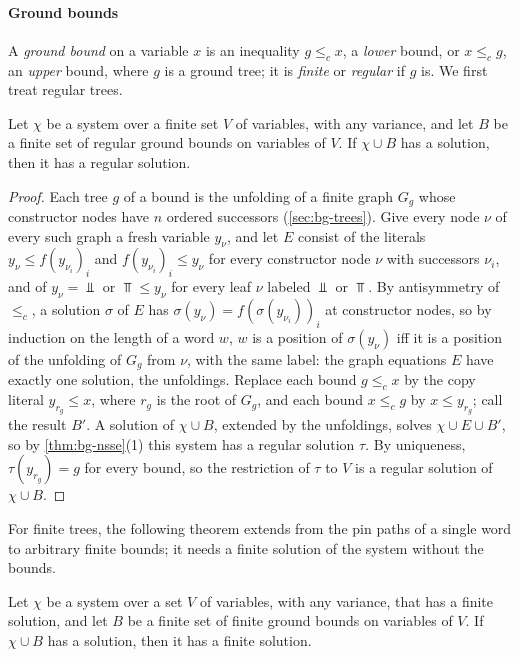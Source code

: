 \paragraph{Ground bounds}
A \emph{ground bound} on a variable $x$ is an inequality $g\le_cx$, a
\emph{lower} bound, or $x\le_cg$, an \emph{upper} bound, where $g$ is a ground
tree; it is \emph{finite} or \emph{regular} if $g$ is. We first treat regular
trees.

\begin{lemma}\label{lem:tc-pinning-regular}
Let $\chi$ be a system over a finite set $V$ of variables, with any variance, and let
$B$ be a finite set of regular ground bounds on variables of $V$. If
$\chi\cup B$ has a solution, then it has a regular solution.
\end{lemma}

\begin{proof}
Each tree $g$ of a bound is the unfolding of a finite graph $G_g$ whose
constructor nodes have $n$ ordered successors (\cref{sec:bg-trees}). Give every
node $\nu$ of every such graph a fresh variable $y_\nu$, and let $E$ consist of
the literals $y_\nu\le f(y_{\nu_i})_i$ and $f(y_{\nu_i})_i\le y_\nu$ for every
constructor node $\nu$ with successors $\nu_i$, and of $y_\nu=\Bot$ or
$\Top\le y_\nu$ for every leaf $\nu$ labeled $\Bot$ or $\Top$. By antisymmetry of
$\le_c$, a solution $\sigma$ of $E$ has $\sigma(y_\nu)=f(\sigma(y_{\nu_i}))_i$
at constructor nodes, so by induction on the length of a word $w$, $w$ is a
position of $\sigma(y_\nu)$ iff it is a position of the unfolding of $G_g$
from $\nu$, with the same label: the graph equations $E$ have exactly one
solution, the unfoldings. Replace each bound $g\le_cx$ by the copy literal
$y_{r_g}\le x$, where $r_g$ is the root of $G_g$, and each bound $x\le_cg$ by
$x\le y_{r_g}$; call the result $B'$. A solution of $\chi\cup B$, extended by
the unfoldings, solves $\chi\cup E\cup B'$, so by \cref{thm:bg-nsse}(1) this
system has a regular solution $\tau$. By uniqueness, $\tau(y_{r_g})=g$ for
every bound, so the restriction of $\tau$ to $V$ is a regular solution of
$\chi\cup B$.
\end{proof}

For finite trees, the following theorem extends
 from the pin paths of a
single word to arbitrary finite bounds; it needs a finite solution of the
system without the bounds.

\begin{theorem}\label{thm:tc-pinning}
Let $\chi$ be a system over a set $V$ of variables, with any variance, that
has a finite solution, and let $B$ be a finite set of finite ground bounds on
variables of $V$. If $\chi\cup B$ has a solution, then it has a finite
solution.
\end{theorem}

